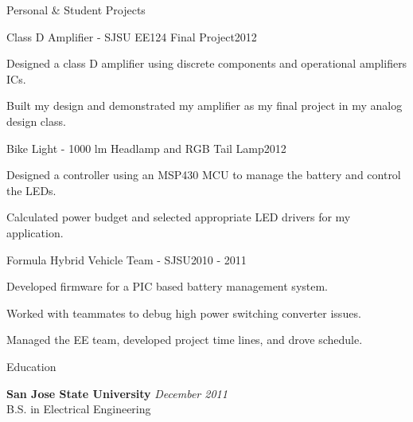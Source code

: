 \documentclass{resume} %
\begin{document}
\pagebreak[3]
\ssquish
\begin{rSection}{Personal \& Student Projects}

\ssquish
\begin{rProject}{Class D Amplifier - SJSU EE124 Final Project}{2012}
\item Designed a class D amplifier using discrete components and operational amplifiers ICs.
\item Built my design and demonstrated my amplifier as my final project in my analog design class.
\end{rProject}

\ssquish
\begin{rProject}{Bike Light - 1000 lm Headlamp and RGB Tail Lamp}{2012}
\item Designed a controller using an MSP430 MCU to manage the battery and control the LEDs.
\item Calculated power budget and selected appropriate LED drivers for my application.
\end{rProject}

\ssquish
\begin{rProject}{Formula Hybrid Vehicle Team - SJSU}{2010 - 2011}
\item Developed firmware for a PIC based battery management system.
\item Worked with teammates to debug high power switching converter issues.
\item Managed the EE team, developed project time lines, and drove schedule.
\end{rProject}
\end{rSection}

\pagebreak[3]
\begin{rSection}{Education}

{\bf San Jose State University} \hfill {\em December 2011} \\ 
B.S. in Electrical Engineering \\

\end{rSection}





\end{document}

